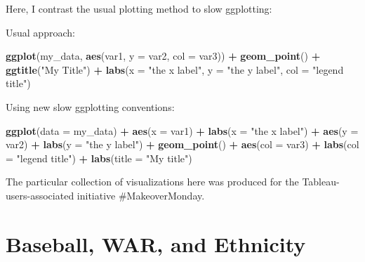 \documentclass[]{book}
\newenvironment{Shaded}{\begin{snugshade}}{\end{snugshade}}
\newcommand{\KeywordTok}[1]{\textcolor[rgb]{0.13,0.29,0.53}{\textbf{#1}}}
\newcommand{\DataTypeTok}[1]{\textcolor[rgb]{0.13,0.29,0.53}{#1}}
\newcommand{\StringTok}[1]{\textcolor[rgb]{0.31,0.60,0.02}{#1}}
\newcommand{\OperatorTok}[1]{\textcolor[rgb]{0.81,0.36,0.00}{\textbf{#1}}}
\newcommand{\NormalTok}[1]{#1}
\theoremstyle{definition}
\theoremstyle{definition}
\theoremstyle{definition}
\theoremstyle{remark}
\begin{document}
Here, I contrast the usual plotting method to slow ggplotting:

Usual approach:

\begin{Shaded}
\begin{Highlighting}[]
\KeywordTok{ggplot}\NormalTok{(my_data, }\KeywordTok{aes}\NormalTok{(var1, }\DataTypeTok{y =}\NormalTok{ var2, }\DataTypeTok{col =}\NormalTok{ var3)) }\OperatorTok{+}
\StringTok{  }\KeywordTok{geom_point}\NormalTok{() }\OperatorTok{+}
\StringTok{  }\KeywordTok{ggtitle}\NormalTok{(}\StringTok{"My Title"}\NormalTok{) }\OperatorTok{+}
\StringTok{  }\KeywordTok{labs}\NormalTok{(}\DataTypeTok{x =} \StringTok{"the x label"}\NormalTok{, }\DataTypeTok{y =} \StringTok{"the y label"}\NormalTok{, }\DataTypeTok{col =} \StringTok{"legend title"}\NormalTok{)}
\end{Highlighting}
\end{Shaded}

Using new slow ggplotting conventions:

\begin{Shaded}
\begin{Highlighting}[]
\KeywordTok{ggplot}\NormalTok{(}\DataTypeTok{data =}\NormalTok{ my_data) }\OperatorTok{+}
\StringTok{  }\KeywordTok{aes}\NormalTok{(}\DataTypeTok{x =}\NormalTok{ var1) }\OperatorTok{+}
\StringTok{  }\KeywordTok{labs}\NormalTok{(}\DataTypeTok{x =} \StringTok{"the x label"}\NormalTok{) }\OperatorTok{+}
\StringTok{  }\KeywordTok{aes}\NormalTok{(}\DataTypeTok{y =}\NormalTok{ var2) }\OperatorTok{+}
\StringTok{  }\KeywordTok{labs}\NormalTok{(}\DataTypeTok{y =} \StringTok{"the y label"}\NormalTok{) }\OperatorTok{+}
\StringTok{  }\KeywordTok{geom_point}\NormalTok{() }\OperatorTok{+}
\StringTok{  }\KeywordTok{aes}\NormalTok{(}\DataTypeTok{col =}\NormalTok{ var3) }\OperatorTok{+}
\StringTok{  }\KeywordTok{labs}\NormalTok{(}\DataTypeTok{col =} \StringTok{"legend title"}\NormalTok{) }\OperatorTok{+}
\StringTok{  }\KeywordTok{labs}\NormalTok{(}\DataTypeTok{title =} \StringTok{"My title"}\NormalTok{)}
\end{Highlighting}
\end{Shaded}

The particular collection of visualizations here was produced for the
Tableau-users-associated initiative \#MakeoverMonday.

\chapter{Baseball, WAR, and Ethnicity}\label{baseball-war-and-ethnicity}
\end{document}
